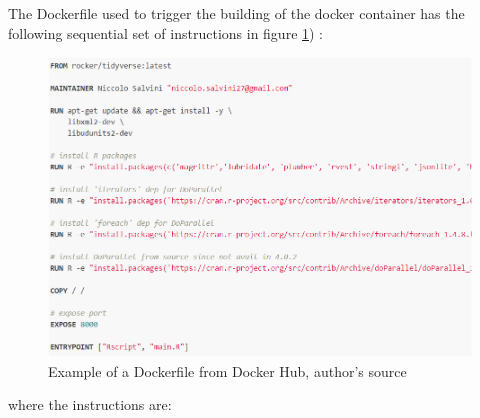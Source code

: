 \documentclass[
  12pt,
  a4paper,
  oneside]{book}
\theoremstyle{definition}
\theoremstyle{definition}
\theoremstyle{definition}
\theoremstyle{remark}
\begin{document}
The Dockerfile used to trigger the building of the docker container has the following sequential set of instructions in figure \ref{fig:dockerfile}) :

\begin{figure}
\centering
\includegraphics{images/dockerfile.PNG}
\caption{\label{fig:dockerfile}Example of a Dockerfile from Docker Hub, author's source}
\end{figure}

where the instructions are:
\end{document}
